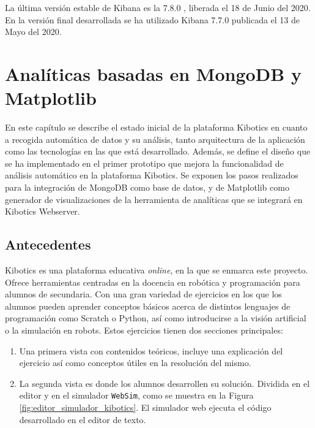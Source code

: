 \documentclass[a4paper, 12pt]{book}
\begin{document}
		La última versión estable de Kibana es la 7.8.0 \cite{versions_kibana}, liberada el 18 de Junio del 2020. En la versión final desarrollada se ha utilizado Kibana 7.7.0 publicada el 13 de Mayo del 2020.
	
	

	\cleardoublepage 
	\chapter{Analíticas basadas en MongoDB y Matplotlib} 
	\label{chap:primer_prototipo} 
		En este capítulo se describe el estado inicial de la plataforma Kibotics en cuanto a recogida automática de datos y su análisis, tanto arquitectura de la aplicación como las tecnologías en las que está desarrollado. Además, se define el diseño que se ha implementado en el primer prototipo que mejora la funcionalidad de análisis automático en la plataforma Kibotics. Se exponen los pasos realizados para la integración de MongoDB como base de datos, y de Matplotlib como generador de visualizaciones de la herramienta de analíticas que se integrará en Kibotics Webserver.
	
	
	\section{Antecedentes} 
	\label{sec:1_antecedentes} 
		Kibotics es una plataforma educativa \textit{online}, en la que se enmarca este proyecto. Ofrece herramientas centradas en la docencia en robótica y programación para alumnos de secundaria. Con una gran variedad de ejercicios en los que los alumnos pueden aprender conceptos básicos acerca de distintos lenguajes de programación como Scratch o Python, así como introducirse a la visión artificial o la simulación en robots. Estos ejercicios tienen dos secciones principales:
		
		
		\begin{enumerate}
			\item Una primera vista con contenidos teóricos, incluye una explicación del ejercicio así como conceptos útiles en la resolución del mismo. 
			\item La segunda vista es donde los alumnos desarrollen su solución. Dividida en el editor y en el simulador \texttt{WebSim}, como se muestra en la Figura \ref{fig:editor_simulador_kibotics}. El simulador web ejecuta el código desarrollado en el editor de texto.
		\end{enumerate}
		
\end{document}
